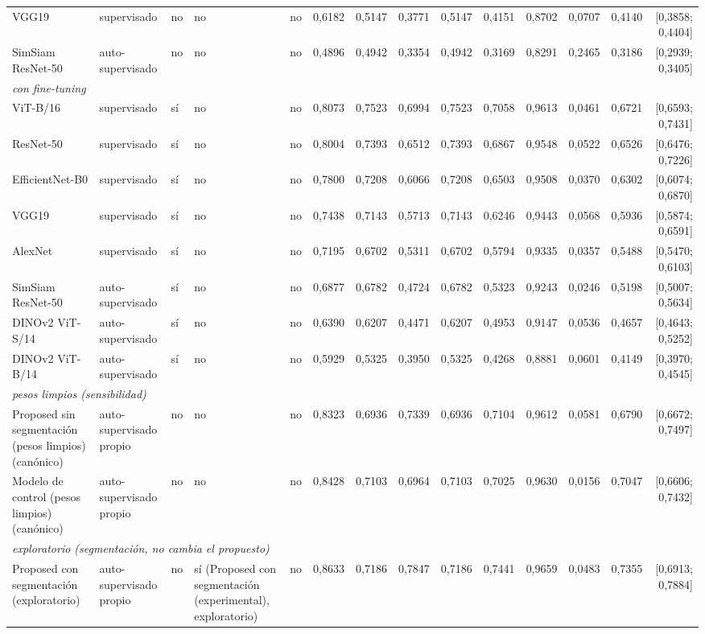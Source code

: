 \begin{table}[ht]
\begin{tabular}{@{}lllllrrrrrrrrr@{}}
VGG19 & supervisado & no & no & no & 0,6182 & 0,5147 & 0,3771 & 0,5147 & 0,4151 & 0,8702 & 0,0707 & 0,4140 & [0,3858; 0,4404] \\
SimSiam ResNet-50 & auto-supervisado & no & no & no & 0,4896 & 0,4942 & 0,3354 & 0,4942 & 0,3169 & 0,8291 & 0,2465 & 0,3186 & [0,2939; 0,3405] \\
\midrule
\multicolumn{14}{l}{\textit{con fine-tuning}} \\
\midrule
ViT-B/16 & supervisado & sí & no & no & 0,8073 & 0,7523 & 0,6994 & 0,7523 & 0,7058 & 0,9613 & 0,0461 & 0,6721 & [0,6593; 0,7431] \\
ResNet-50 & supervisado & sí & no & no & 0,8004 & 0,7393 & 0,6512 & 0,7393 & 0,6867 & 0,9548 & 0,0522 & 0,6526 & [0,6476; 0,7226] \\
EfficientNet-B0 & supervisado & sí & no & no & 0,7800 & 0,7208 & 0,6066 & 0,7208 & 0,6503 & 0,9508 & 0,0370 & 0,6302 & [0,6074; 0,6870] \\
VGG19 & supervisado & sí & no & no & 0,7438 & 0,7143 & 0,5713 & 0,7143 & 0,6246 & 0,9443 & 0,0568 & 0,5936 & [0,5874; 0,6591] \\
AlexNet & supervisado & sí & no & no & 0,7195 & 0,6702 & 0,5311 & 0,6702 & 0,5794 & 0,9335 & 0,0357 & 0,5488 & [0,5470; 0,6103] \\
SimSiam ResNet-50 & auto-supervisado & sí & no & no & 0,6877 & 0,6782 & 0,4724 & 0,6782 & 0,5323 & 0,9243 & 0,0246 & 0,5198 & [0,5007; 0,5634] \\
DINOv2 ViT-S/14 & auto-supervisado & sí & no & no & 0,6390 & 0,6207 & 0,4471 & 0,6207 & 0,4953 & 0,9147 & 0,0536 & 0,4657 & [0,4643; 0,5252] \\
DINOv2 ViT-B/14 & auto-supervisado & sí & no & no & 0,5929 & 0,5325 & 0,3950 & 0,5325 & 0,4268 & 0,8881 & 0,0601 & 0,4149 & [0,3970; 0,4545] \\
\midrule
\multicolumn{14}{l}{\textit{pesos limpios (sensibilidad)}} \\
\midrule
Proposed sin segmentación (pesos limpios) (canónico) & auto-supervisado propio & no & no & no & 0,8323 & 0,6936 & 0,7339 & 0,6936 & 0,7104 & 0,9612 & 0,0581 & 0,6790 & [0,6672; 0,7497] \\
Modelo de control (pesos limpios) (canónico) & auto-supervisado propio & no & no & no & 0,8428 & 0,7103 & 0,6964 & 0,7103 & 0,7025 & 0,9630 & 0,0156 & 0,7047 & [0,6606; 0,7432] \\
\midrule
\multicolumn{14}{l}{\textit{exploratorio (segmentación, no cambia el propuesto)}} \\
\midrule
Proposed con segmentación (exploratorio) & auto-supervisado propio & no & sí (Proposed con segmentación (experimental), exploratorio) & no & 0,8633 & 0,7186 & 0,7847 & 0,7186 & 0,7441 & 0,9659 & 0,0483 & 0,7355 & [0,6913; 0,7884] \\

\end{tabular}
\end{table}
